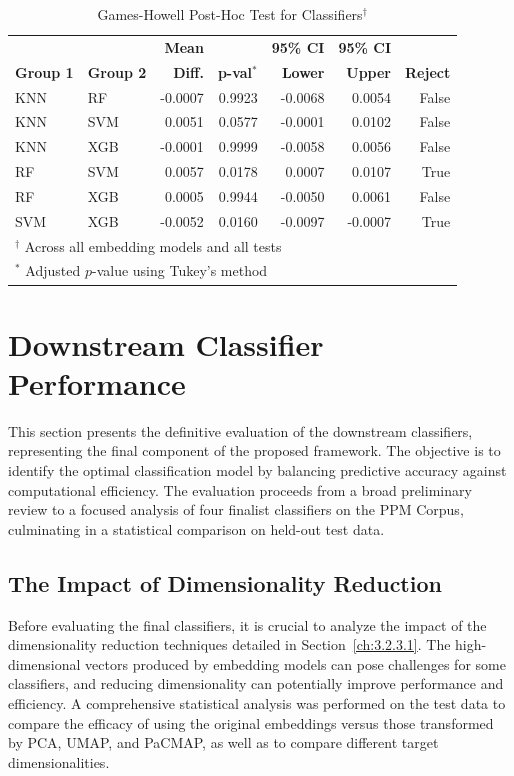 \begin{table}[!htbp]
    \captionsetup{skip=5pt}
\centering
\caption{Games-Howell Post-Hoc Test for Classifiers\(^\dagger\)}
\label{tbl:games_howell_embedding_model}
        \begin{tabular}{llrrrrr}
            \toprule
             &  & \textbf{Mean} &  & \textbf{95\% CI} & \textbf{95\% CI} & \\
            \textbf{Group 1} & \textbf{Group 2} & \textbf{Diff.} & \textbf{p-val}\(^*\) & \textbf{Lower} & \textbf{Upper} & \textbf{Reject}\\
\midrule
KNN & RF & -0.0007 & 0.9923 & -0.0068 & 0.0054 & False \\
KNN & SVM & 0.0051 & 0.0577 & -0.0001 & 0.0102 & False \\
KNN & XGB & -0.0001 & 0.9999 & -0.0058 & 0.0056 & False \\
RF & SVM & 0.0057 & 0.0178 & 0.0007 & 0.0107 & True \\
RF & XGB & 0.0005 & 0.9944 & -0.0050 & 0.0061 & False \\
SVM & XGB & -0.0052 & 0.0160 & -0.0097 & -0.0007 & True \\
\bottomrule
\multicolumn{7}{l}{\scriptsize\(^\dagger\) Across all embedding models and all tests}\\
\multicolumn{7}{l}{\scriptsize\(^*\) Adjusted \(p\)-value using Tukey's method}
\end{tabular}
\end{table}

\section{Downstream Classifier Performance}\label{ch:4.5}
This section presents the definitive evaluation of the downstream classifiers, representing the final component of the proposed framework. The objective is to identify the optimal classification model by balancing predictive accuracy against computational efficiency. The evaluation proceeds from a broad preliminary review to a focused analysis of four finalist classifiers on the PPM Corpus, culminating in a statistical comparison on held-out test data.

\subsection{The Impact of Dimensionality Reduction}\label{ch:4.5.1}
Before evaluating the final classifiers, it is crucial to analyze the impact of the dimensionality reduction techniques detailed in Section~\ref{ch:3.2.3.1}. The high-dimensional vectors produced by embedding models can pose challenges for some classifiers, and reducing dimensionality can potentially improve performance and efficiency. A comprehensive statistical analysis was performed on the test data to compare the efficacy of using the original embeddings versus those transformed by PCA, UMAP, and PaCMAP, as well as to compare different target dimensionalities.

